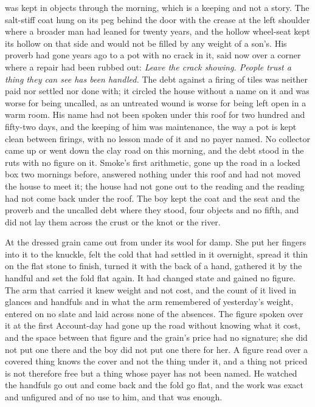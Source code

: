  was kept in objects through the morning, which is a keeping and not a story. The salt-stiff coat hung on its peg behind the door with the crease at the left shoulder where a broader man had leaned for twenty years, and the hollow wheel-seat kept its hollow on that side and would not be filled by any weight of a son's. His proverb had gone years ago to a pot with no crack in it, said now over a corner where a repair had been rubbed out: \emph{Leave the crack showing. People trust a thing they can see has been handled.} The debt against a firing of tiles was neither paid nor settled nor done with; it circled the house without a name on it and was worse for being uncalled, as an untreated wound is worse for being left open in a warm room. His name had not been spoken under this roof for two hundred and fifty-two days, and the keeping of him was maintenance, the way a pot is kept clean between firings, with no lesson made of it and no payer named. No collector came up or went down the clay road on this morning, and the debt stood in the ruts with no figure on it. Smoke's first arithmetic, gone up the road in a locked box two mornings before, answered nothing under this roof and had not moved the house to meet it; the house had not gone out to the reading and the reading had not come back under the roof. The boy kept the coat and the seat and the proverb and the uncalled debt where they stood, four objects and no fifth, and did not lay them across the crust or the knot or the river.

At  the dressed grain came out from under its wool for damp. She put her fingers into it to the knuckle, felt the cold that had settled in it overnight, spread it thin on the flat stone to finish, turned it with the back of a hand, gathered it by the handful and set the fold flat again. It had changed state and gained no figure. The arm that carried it knew weight and not cost, and the count of it lived in glances and handfuls and in what the arm remembered of yesterday's weight, entered on no slate and laid across none of the absences. The figure spoken over it at the first Account-day had gone up the road without knowing what it cost, and the space between that figure and the grain's price had no signature; she did not put one there and the boy did not put one there for her. A figure read over a covered thing knows the cover and not the thing under it, and a thing not priced is not therefore free but a thing whose payer has not been named. He watched the handfuls go out and come back and the fold go flat, and the work was exact and unfigured and of no use to him, and that was enough.

